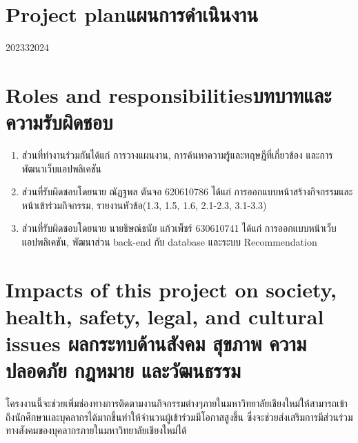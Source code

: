 \section{\ifenglish Project plan\else แผนการดำเนินงาน\fi}

\begin{plan}{6}{2023}{3}{2024}

\end{plan}

\section{\ifenglish Roles and responsibilities\else บทบาทและความรับผิดชอบ\fi}
\begin{enumerate}
    \item ส่วนที่ทำงานร่วมกันได้แก่ การวางแผนงาน, การค้นหาความรู้และทฤษฎีที่เกี่ยวข้อง และการพัฒนาเว็บแอปพลิเคชัน
    \item ส่วนที่รับผิดชอบโดยนาย ณัฏฐพล ตันจอ 620610786 ได้แก่ การออกแบบหน้าสร้างกิจกรรมและหน้าเข้าร่วมกิจกรรม, รายงานหัวข้อ(1.3, 1.5, 1.6, 2.1-2.3, 3.1-3.3) 
    \item ส่วนที่รับผิดชอบโดยนาย นายธิษณ์ธนัย แก้วเพ็ชร์ 630610741 ได้แก่ การออกแบบหน้าเว็บแอปพลิเคชัน, พัฒนาส่วน back-end กับ database และระบบ Recommendation 
\end{enumerate}

\section{\ifenglish%
Impacts of this project on society, health, safety, legal, and cultural issues
\else%
ผลกระทบด้านสังคม สุขภาพ ความปลอดภัย กฎหมาย และวัฒนธรรม
\fi}

โครงงานนี้จะช่วยเพิ่มช่องทางการติดตามงานกิจกรรมต่างๆภายในมหาวิทยาลัยเชียงใหม่ให้สามารถเข้าถึงนักศึกษาเเละบุคลากรได้มากขึ้นทำให้จำนวนผู้เข้าร่วมมีโอกาสสูงขึ้น ซึ่งจะช่วยส่งเสริมการมีส่วนร่วมทางสังคมของบุคลากรภายในมหาวิทยาลัยเชียงใหม่ได้